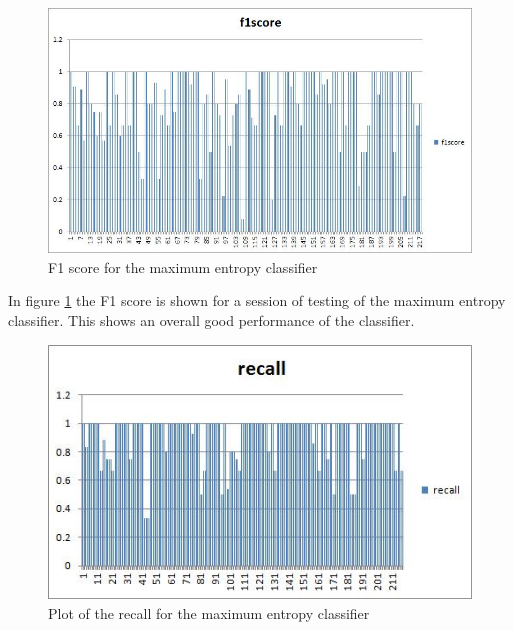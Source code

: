 \begin{figure}[tbh]
\centering
\includegraphics[scale=0.59]{f1score.jpg}
\caption{F1 score for the maximum entropy classifier}
\label{fig:f1s}
\end{figure}
\par
In figure \ref{fig:f1s} the F1 score is shown for a session of testing of the maximum entropy classifier. This shows an overall good performance of the classifier.

\begin{figure}[tbh]
\centering
\includegraphics[scale=0.9]{recall.jpg}
\caption{Plot of the recall for the maximum entropy classifier}
\label{fig:rec}
\end{figure}

